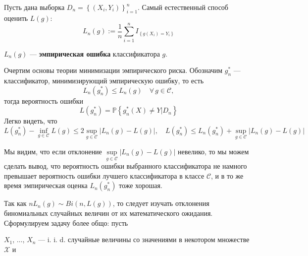 \documentclass[12pt]{article}
\begin{document}
Пусть дана выборка $D_n=\left\{(X_i,Y_i)\right\}_{i=1}^{n}$. Самый естественный способ оценить $L(g)$:
\begin{equation*}
	L_n(g):=\frac{1}{n}\sum\limits_{i=1}^{n}I_{\left\{g(X_i)=Y_i\right\}}
\end{equation*}

$L_n(g)$ --- \textbf{эмпирическая ошибка} классификатора $g$.

Очертим основы теории минимизации эмпирического риска. Обозначим $g_n^*$ --- классификатор, минимизирующий эмпирическую ошибку, то есть
\begin{equation*}
	L_n(g_n^*)\leqslant L_n(g) \quad \forall\, g\in\mathcal{C},
\end{equation*}
тогда вероятность ошибки
\begin{equation*}
	L(g_n^*)=\mathbb{P}\left\{g_n^*(X)\ne Y| D_n\right\}
\end{equation*}
Легко видеть, что
\begin{equation*}
	L(g_n^*)-\inf\limits_{g\in\mathcal{C}}L(g)\leqslant2\sup\limits_{g\in\mathcal{C}}|L_n(g)-L(g)|, \quad L(g_n^*)\leqslant L_n(g_n^*)+\sup\limits_{g\in\mathcal{C}}|L_n(g)-L(g)|
\end{equation*}

Мы видим, что если отклонение $\sup\limits_{g\in\mathcal{C}}|L_n(g)-L(g)|$ невелико, то мы можем сделать вывод, что вероятность ошибки выбранного классификатора не намного превышает вероятность ошибки лучшего классификатора в классе $\mathcal{C}$, и в то же время эмпирическая оценка $L_n(g_n^*)$ тоже хорошая.

Так как $nL_n(g)\sim Bi(n,L(g))$, то следует изучать отклонения биномиальных случайных величин от их математического ожидания. Сформулируем задачу более общо: пусть

\noindent$X_1$, $\dots$, $X_n$ --- i. i. d. случайные величины со значениями в некотором множестве $\mathscr{X}$ и
\end{document}
